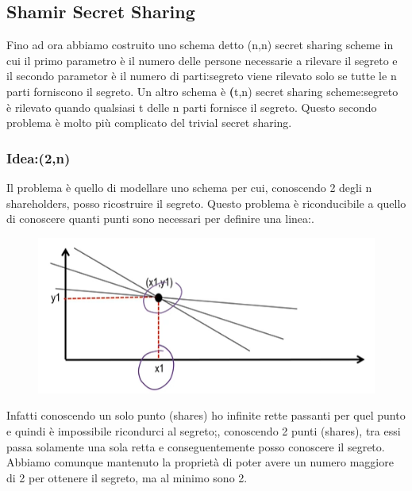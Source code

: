 \documentclass{book}
\theoremstyle{definition}
\begin{document}
\subsection{Shamir Secret Sharing}
Fino ad ora abbiamo costruito uno schema detto (n,n) secret sharing scheme in cui il primo parametro è il numero delle persone necessarie a rilevare il segreto e il secondo parametor è il numero di parti:\@il segreto viene rilevato solo se tutte le n parti forniscono il segreto\@.\newline
Un altro schema è \textbf(t,n) secret sharing scheme:\@il segreto è rilevato quando qualsiasi t delle n parti fornisce il segreto\@. Questo secondo problema è molto più complicato del trivial secret sharing\@.
\subsubsection{Idea:\@Schema (2,n)}
Il problema è quello di modellare uno schema per cui, conoscendo 2 degli n shareholders, posso ricostruire il segreto\@. Questo problema è riconducibile a quello di conoscere quanti punti sono necessari per definire una linea:\@.
\begin{figure}[h]
    \centering
    \includegraphics[scale=0.5]{2021-12-26-18-33-00.png}%
\end{figure}
Infatti conoscendo un solo punto (shares) ho infinite rette passanti per quel punto e quindi è impossibile ricondurci al segreto;\@tuttavia, conoscendo 2 punti (shares), tra essi passa solamente una sola retta e conseguentemente posso conoscere il segreto\@. Abbiamo comunque mantenuto la proprietà di poter avere un numero maggiore di 2 per ottenere il segreto, ma al minimo sono 2\@.
\end{document}
